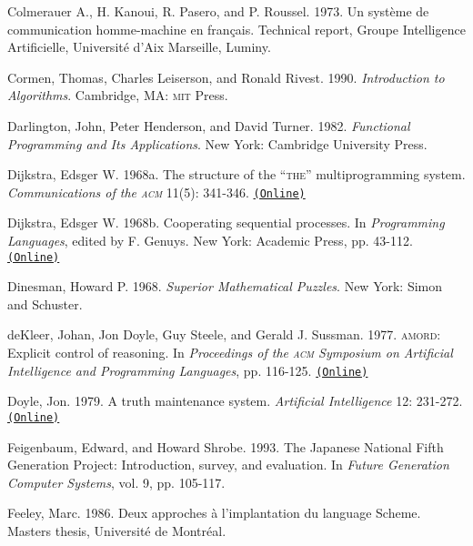 \documentclass[oneside]{book}
\newcommand{\acronym}[1]{\textsc{\MakeLowercase{#1}}}
\newcommand{\code}[1]{\texttt{#1}}
\begin{document}
 \label{Colmerauer et al. 1973}
Colmerauer A., H. Kanoui, R. Pasero, and P. Roussel.  1973.  Un syst\`eme de
communication homme-machine en fran\c{c}ais.  Technical report, Groupe
Intelligence Artificielle, Universit\'e d'Aix Marseille, Luminy.

 \label{Cormen et al. 1990}
Cormen, Thomas, Charles Leiserson, and Ronald Rivest.  1990. \textit{Introduction
to Algorithms}. Cambridge, MA: \acronym{MIT} Press.

 \label{Darlington et al. 1982}
Darlington, John, Peter Henderson, and David Turner.  1982.  \textit{Functional
Programming and Its Applications}. New York: Cambridge University Press.

 \label{Dijkstra 1968a}
Dijkstra, Edsger W. 1968a.  The structure of the ``\acronym{THE}''
multiprogramming system.  \textit{Communications of the \acronym{ACM}}
11(5): 341-346.
\href{http://www.cs.utexas.edu/users/EWD/ewd01xx/EWD196.PDF}{\code{(Online)}}

 \label{Dijkstra 1968b}
Dijkstra, Edsger W. 1968b.  Cooperating sequential processes.  In
\textit{Programming Languages}, edited by F. Genuys. New York: Academic Press,
pp.  43-112.
\href{http://www.cs.utexas.edu/users/EWD/ewd01xx/EWD123.PDF}{\code{(Online)}}

 \label{Dinesman 1968}
Dinesman, Howard P.  1968.  \textit{Superior Mathematical Puzzles}.  New York:
Simon and Schuster.

 \label{deKleer et al. 1977}
deKleer, Johan, Jon Doyle, Guy Steele, and Gerald J. Sussman.  1977.
\acronym{AMORD}: Explicit control of reasoning.  In \textit{Proceedings of the
\acronym{ACM} Symposium on Artificial Intelligence and Programming Languages},
pp.  116-125.
\href{http://dspace.mit.edu/handle/1721.1/5750}{\code{(Online)}}

 \label{Doyle (1979)}
Doyle, Jon. 1979. A truth maintenance system. \textit{Artificial Intelligence}
12: 231-272.
\href{http://dspace.mit.edu/handle/1721.1/5733}{\code{(Online)}}

 \label{Feigenbaum and Shrobe 1993}
Feigenbaum, Edward, and Howard Shrobe. 1993. The Japanese National Fifth
Generation Project: Introduction, survey, and evaluation.  In \textit{Future
Generation Computer Systems}, vol. 9, pp. 105-117.

 \label{Feeley (1986)}
Feeley, Marc.  1986.  Deux approches \`a l'implantation du language
Scheme.  Masters thesis, Universit\'e de Montr\'eal.
\end{document}
